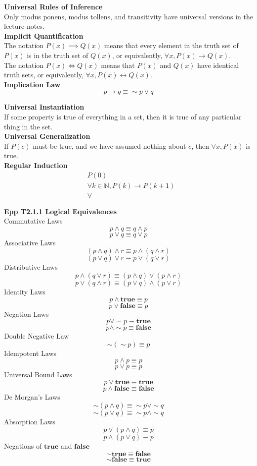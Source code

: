 \documentclass[a4paper]{article}
\newcommand{\subheading}[1]{{\scriptsize\textbf{#1}}}
\begin{document}
\begin{multicols*}{4}
\subheading{Universal Rules of Inference}\\
Only modus ponens, modus tollens, and transitivity have universal versions in
the lecture notes.\\

\subheading{Implicit Quantification}\\
The notation $P(x) \implies Q(x)$ means that every element in the truth set of
$P(x)$ is in the truth set of $Q(x)$, or equivalently, $\forall x, P(x)
\rightarrow Q(x)$.\\

The notation $P(x) \iff Q(x)$ means that $P(x)$ and $Q(x)$ have identical truth
sets, or equivalently, $\forall x, P(x) \leftrightarrow Q(x)$.\\

\subheading{Implication Law}\\
$$p \rightarrow q \equiv \sim p \lor q$$

\subheading{Universal Instantiation}\\
If some property is true of everything in a set, then it is true of any
particular thing in the set.\\

\subheading{Universal Generalization}\\
If $P(c)$ must be true, and we have assumed nothing about $c$, then $\forall x,
P(x)$ is true.\\

\subheading{Regular Induction}\\
\begin{eqnarray*}
  &P(0) \\
  &\forall k \in \mathbb{N}, P(k) \rightarrow P(k+1) \\
  & \forall
\end{eqnarray*}

\subheading{Epp T2.1.1 Logical Equivalences}\\
Commutative Laws
  $$ p \land q \equiv q \land p $$
  $$ p \lor  q \equiv q \lor  p $$
Associative Laws
  $$ (p \land q) \land r \equiv p \land (q \land r) $$
  $$ (p \lor  q) \lor  r \equiv p \lor  (q \lor  r) $$
Distributive Laws
  $$ p \land (q \lor  r) \equiv (p \land q) \lor  (p \land r) $$
  $$ p \lor  (q \land r) \equiv (p \lor  q) \land (p \lor  r) $$
Identity Laws
  $$ p \land \textbf{true} \equiv p $$
  $$ p \lor  \textbf{false} \equiv p $$
Negation Laws
  $$ p \lor  \sim p \equiv \textbf{true} $$
  $$ p \land \sim p \equiv \textbf{false} $$
Double Negative Law
  $$ \sim ( \sim p ) \equiv p $$
Idempotent Laws
  $$ p \land p \equiv p $$
  $$ p \lor  p \equiv p $$
Universal Bound Laws
  $$ p \lor  \textbf{true} \equiv \textbf{true} $$
  $$ p \land \textbf{false} \equiv \textbf{false} $$
De Morgan's Laws
  $$ \sim ( p \land q ) \equiv \sim p \lor  \sim q $$
  $$ \sim ( p \lor  q ) \equiv \sim p \land \sim q $$
Absorption Laws
  $$ p \lor  (p \land q) \equiv p $$
  $$ p \land (p \lor  q) \equiv p $$
Negations of $\textbf{true}$ and $\textbf{false}$
  $$ \sim \textbf{true} \equiv \textbf{false} $$
  $$ \sim \textbf{false} \equiv \textbf{true} $$


\end{multicols*}
\end{document}

